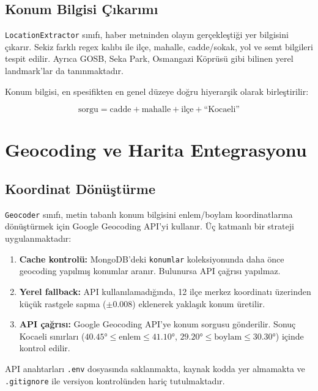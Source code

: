 \documentclass[conference]{IEEEtran}
\begin{document}
\subsection{Konum Bilgisi Çıkarımı}

\texttt{LocationExtractor} sınıfı, haber metninden olayın gerçekleştiği yer bilgisini çıkarır. Sekiz farklı regex kalıbı ile ilçe, mahalle, cadde/sokak, yol ve semt bilgileri tespit edilir. Ayrıca GOSB, Seka Park, Osmangazi Köprüsü gibi bilinen yerel landmark'lar da tanınmaktadır.

Konum bilgisi, en spesifikten en genel düzeye doğru hiyerarşik olarak birleştirilir:

\begin{equation*}
    \text{sorgu} = \text{cadde} + \text{mahalle} + \text{ilçe} + \text{``Kocaeli''}
\end{equation*}

\section{Geocoding ve Harita Entegrasyonu}

\subsection{Koordinat Dönüştürme}

\texttt{Geocoder} sınıfı, metin tabanlı konum bilgisini enlem/boylam koordinatlarına dönüştürmek için Google Geocoding API'yi kullanır. Üç katmanlı bir strateji uygulanmaktadır:

\begin{enumerate}
    \item \textbf{Cache kontrolü:} MongoDB'deki \texttt{konumlar} koleksiyonunda daha önce geocoding yapılmış konumlar aranır. Bulunursa API çağrısı yapılmaz.
    \item \textbf{Yerel fallback:} API kullanılamadığında, 12 ilçe merkez koordinatı üzerinden küçük rastgele sapma ($\pm 0.008$) eklenerek yaklaşık konum üretilir.
    \item \textbf{API çağrısı:} Google Geocoding API'ye konum sorgusu gönderilir. Sonuç Kocaeli sınırları ($40.45° \leq \text{enlem} \leq 41.10°$, $29.20° \leq \text{boylam} \leq 30.30°$) içinde kontrol edilir.
\end{enumerate}

API anahtarları \texttt{.env} dosyasında saklanmakta, kaynak kodda yer almamakta ve \texttt{.gitignore} ile versiyon kontrolünden hariç tutulmaktadır.
\end{document}
